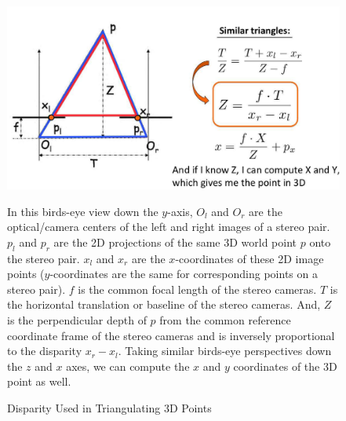 \begin{figure}[!h]
    \includegraphics[width=1\columnwidth]{figures/disparity-triangulation.png}
    \caption{Disparity Used in Triangulating 3D Points~\cite{fidler_depth_2021}}
    \label{fig:disparity-triangulation}
    {\small In this birds-eye view down the $y$-axis, $O_l$ and $O_r$ are the optical/camera centers of the left and right images of a stereo pair. $p_l$ and $p_r$ are the 2D projections of the same 3D world point $p$ onto the stereo pair. $x_l$ and $x_r$ are the $x$-coordinates of these 2D image points ($y$-coordinates are the same for corresponding points on a stereo pair). $f$ is the common focal length of the stereo cameras. $T$ is the horizontal translation or baseline of the stereo cameras. And, $Z$ is the perpendicular depth of $p$ from the common reference coordinate frame of the stereo cameras and is inversely proportional to the disparity $x_r - x_l$. Taking similar birds-eye perspectives down the $z$ and $x$ axes, we can compute the $x$ and $y$ coordinates of the 3D point as well.}
\end{figure}

